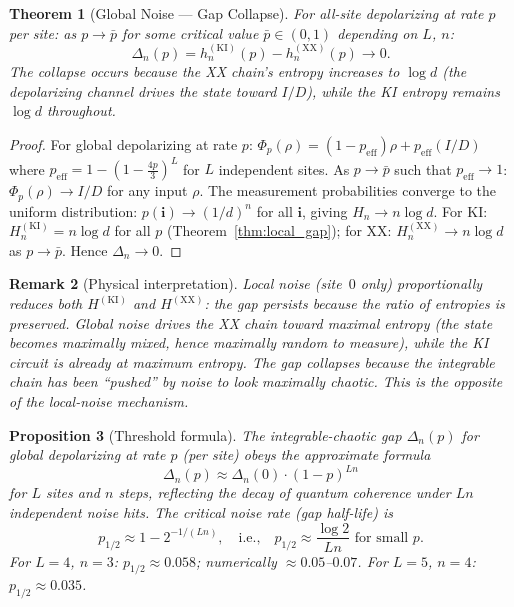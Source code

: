 \documentclass[12pt,a4paper]{article}
\newtheorem{theorem}{Theorem}[section]
\newtheorem{proposition}[theorem]{Proposition}
\newtheorem{remark}[theorem]{Remark}
\begin{document}
\begin{theorem}[Global Noise --- Gap Collapse]
\label{thm:global_gap}
For all-site depolarizing at rate $p$ per site: as $p\to\bar{p}$ for
some critical value $\bar{p}\in(0,1)$ depending on $L$, $n$:
\[
  \Delta_n(p) = h_n^{(\mathrm{KI})}(p) - h_n^{(\mathrm{XX})}(p) \to 0.
\]
The collapse occurs because the XX chain's entropy
\emph{increases} to $\log d$ (the depolarizing channel drives the state toward
$I/D$), while the KI entropy remains $\log d$ throughout.
\end{theorem}
\begin{proof}
For global depolarizing at rate $p$:
$\Phi_p(\rho)=(1-p_{\mathrm{eff}})\rho + p_{\mathrm{eff}}(I/D)$
where $p_{\mathrm{eff}}=1-(1-\tfrac{4p}{3})^L$ for $L$ independent sites.
As $p\to\bar{p}$ such that $p_{\mathrm{eff}}\to 1$: $\Phi_p(\rho)\to I/D$
for any input $\rho$.  The measurement probabilities converge to the
uniform distribution: $p(\mathbf{i})\to(1/d)^n$ for all $\mathbf{i}$,
giving $H_n\to n\log d$.  For KI: $H_n^{(\mathrm{KI})}=n\log d$ for all
$p$ (Theorem~\ref{thm:local_gap}); for XX: $H_n^{(\mathrm{XX})}\to n\log d$
as $p\to\bar{p}$.  Hence $\Delta_n\to 0$.
\end{proof}

\begin{remark}[Physical interpretation]
Local noise (site~$0$ only) \emph{proportionally} reduces both $H^{(\mathrm{KI})}$
and $H^{(\mathrm{XX})}$: the gap persists because the \emph{ratio} of
entropies is preserved.
Global noise drives the \emph{XX chain toward maximal entropy} (the state
becomes maximally mixed, hence maximally random to measure), while the KI
circuit is already at maximum entropy.  The gap collapses because the
integrable chain has been ``pushed'' by noise to look maximally chaotic.
This is the opposite of the local-noise mechanism.
\end{remark}

\begin{proposition}[Threshold formula]
\label{prop:threshold}
The integrable-chaotic gap $\Delta_n(p)$ for global depolarizing at rate $p$
(per site) obeys the approximate formula
\[
  \Delta_n(p) \approx \Delta_n(0) \cdot (1-p)^{L n}
\]
for $L$ sites and $n$ steps, reflecting the decay of quantum coherence under
$Ln$ independent noise hits.  The critical noise rate (gap half-life) is
\[
  p_{1/2} \approx 1 - 2^{-1/(Ln)},
  \quad\text{i.e.,}\quad
  p_{1/2}\approx \frac{\log 2}{Ln}
  \text{ for small }p.
\]
For $L=4$, $n=3$: $p_{1/2}\approx 0.058$; numerically $\approx 0.05$--$0.07$.
For $L=5$, $n=4$: $p_{1/2}\approx 0.035$.
\end{proposition}
\end{document}
